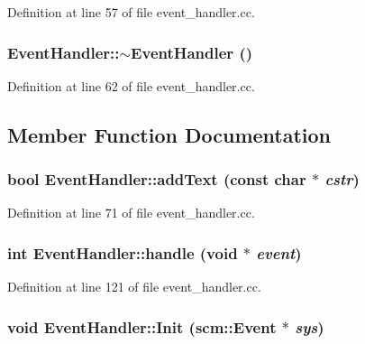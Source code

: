 Definition at line 57 of file event\_\-handler.cc.

\hypertarget{class_event_handler_a3decb8cd88ba8af2b9b0b0f0f2fcd722}{
\subsubsection[{$\sim$EventHandler}]{\setlength{\rightskip}{0pt plus 5cm}EventHandler::$\sim$EventHandler ()}}
\label{class_event_handler_a3decb8cd88ba8af2b9b0b0f0f2fcd722}


Definition at line 62 of file event\_\-handler.cc.



\subsection{Member Function Documentation}
\hypertarget{class_event_handler_a18771c6be120edf9d912a4003066b8b3}{
\subsubsection[{addText}]{\setlength{\rightskip}{0pt plus 5cm}bool EventHandler::addText (const char $\ast$ {\em cstr})}}
\label{class_event_handler_a18771c6be120edf9d912a4003066b8b3}


Definition at line 71 of file event\_\-handler.cc.

\hypertarget{class_event_handler_a2fcafd6f528017d8a814f9c384e2e057}{
\subsubsection[{handle}]{\setlength{\rightskip}{0pt plus 5cm}int EventHandler::handle (void $\ast$ {\em event})}}
\label{class_event_handler_a2fcafd6f528017d8a814f9c384e2e057}


Definition at line 121 of file event\_\-handler.cc.

\hypertarget{class_event_handler_a67d149352861c0a8fe603a14585d1003}{
\subsubsection[{Init}]{\setlength{\rightskip}{0pt plus 5cm}void EventHandler::Init ({\bf scm::Event} $\ast$ {\em sys})}}
\label{class_event_handler_a67d149352861c0a8fe603a14585d1003}



